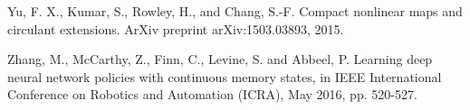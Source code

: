 \documentclass[a4paper,11pt]{article}
\begin{document}
\begin{thebibliography}{1}
  Yu, F.  X.,  Kumar, S.,   Rowley, H.,  and  Chang, S.-F. Compact nonlinear maps and circulant extensions. ArXiv preprint arXiv:1503.03893, 2015.



 Zhang, M., McCarthy, Z., Finn, C., Levine, S. and Abbeel, P. Learning deep neural network policies with continuous memory states, in IEEE International Conference on Robotics and Automation (ICRA), May 2016, pp. 520-527.




\end{thebibliography}
\end{document}
